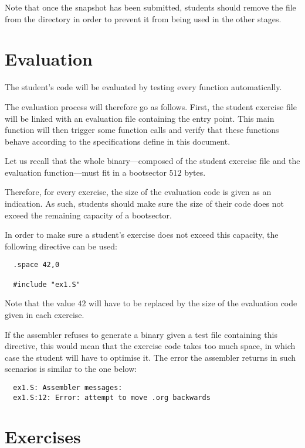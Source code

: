 Note that once the snapshot has been submitted, students should
remove the file from the  directory in order
to prevent it from being used in the other stages.

%
%

\section{Evaluation}

The student's code will be evaluated by testing every function automatically.

The evaluation process will therefore go as follows. First, the student
exercise file will be linked with an evaluation file containing the entry
point. This main function will then trigger some function calls and verify
that these functions behave according to the specifications define in this
document.

Let us recall that the whole binary---composed of the student exercise file
and the evaluation function---must fit in a bootsector \ie{} $512$ bytes.

Therefore, for every exercise, the size of the evaluation code is given
as an indication. As such, students should make sure the size of their code
does not exceed the remaining capacity of a bootsector.

In order to make sure a student's exercise does not exceed this capacity,
the following directive can be used:

\begin{verbatim}
  .space 42,0

  #include "ex1.S"
\end{verbatim}

Note that the value $42$ will have to be replaced by the size of the
evaluation code given in each exercise.

If the assembler refuses to generate a binary given a test file containing
this directive, this would mean that the exercise code takes too much space,
in which case the student will have to optimise it. The error the assembler
returns in such scenarios is similar to the one below:

\begin{verbatim}
  ex1.S: Assembler messages:
  ex1.S:12: Error: attempt to move .org backwards
\end{verbatim}

%
%

\section{Exercises}

